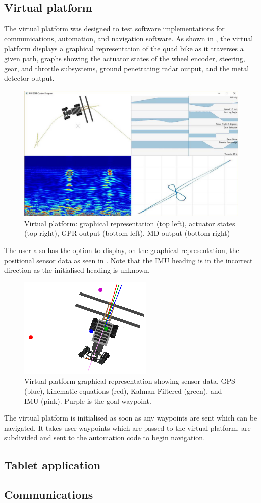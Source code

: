 \documentclass[main.tex]{subfiles}
\begin{document}
\subsection{Virtual platform}
The virtual platform was designed to test software implementations for communications, automation, and navigation software. As shown in , the virtual platform displays a graphical representation of the quad bike as it traverses a given path, graphs showing the actuator states of the wheel encoder, steering, gear, and throttle subsystems, ground penetrating radar output, and the metal detector output.
\begin{figure}[ht]
\includegraphics[width=\textwidth]{4-DetailedDesign/virtualPlatform.jpg}
\centering
\caption{Virtual platform: graphical representation (top left), actuator states (top right), GPR output (bottom left), MD output (bottom right)} 
\end{figure}
The user also has the option to display, on the graphical representation, the positional sensor data as seen in . Note that the IMU heading is in the incorrect direction as the initialised heading is unknown.
\begin{figure}[ht]
\includegraphics[]{4-DetailedDesign/dataVisibleVirtualPlatform.PNG}
\centering
\caption{Virtual platform graphical representation showing sensor data, GPS (blue), kinematic equations (red), Kalman Filtered (green), and IMU (pink). Purple is the goal waypoint.} 
\end{figure}
The virtual platform is initialised as soon as any waypoints are sent which can be navigated. It takes user waypoints which are passed to the virtual platform, are subdivided and sent to the automation code to begin navigation.

\subsection{Tablet application}

\subsection{Communications}
\end{document}
